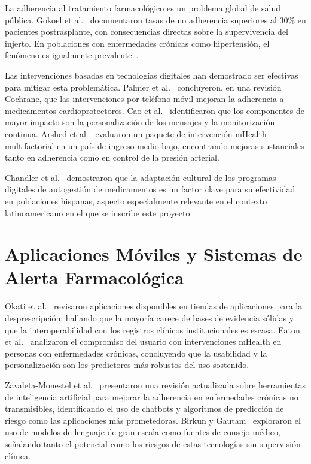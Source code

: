 \documentclass[12pt, letterpaper]{report}
\begin{document}
La adherencia al tratamiento farmacológico es un problema global de salud pública.
Gokoel et al.~\cite{gokoel2020medication} documentaron tasas de no adherencia
superiores al 30\% en pacientes postrasplante, con consecuencias directas sobre la
supervivencia del injerto. En poblaciones con enfermedades crónicas como hipertensión,
el fenómeno es igualmente prevalente~\cite{etminani2020behavior}.

Las intervenciones basadas en tecnologías digitales han demostrado ser efectivas para
mitigar esta problemática. Palmer et al.~\cite{palmer2021mobile} concluyeron, en una
revisión Cochrane, que las intervenciones por teléfono móvil mejoran la adherencia a
medicamentos cardioprotectores. Cao et al.~\cite{cao2022mhealth} identificaron que los
componentes de mayor impacto son la personalización de los mensajes y la monitorización
continua. Arshed et al.~\cite{arshed2024effectiveness} evaluaron un paquete de
intervención mHealth multifactorial en un país de ingreso medio-bajo, encontrando
mejoras sustanciales tanto en adherencia como en control de la presión arterial.

Chandler et al.~\cite{chandler2019impact} demostraron que la adaptación cultural de
los programas digitales de autogestión de medicamentos es un factor clave para su
efectividad en poblaciones hispanas, aspecto especialmente relevante en el contexto
latinoamericano en el que se inscribe este proyecto.

\section{Aplicaciones Móviles y Sistemas de Alerta Farmacológica}

Okati et al.~\cite{okati2025mobile} revisaron aplicaciones disponibles en tiendas de
aplicaciones para la desprescripción, hallando que la mayoría carece de bases de
evidencia sólidas y que la interoperabilidad con los registros clínicos institucionales
es escasa. Eaton et al.~\cite{eaton2024user} analizaron el compromiso del usuario con
intervenciones mHealth en personas con enfermedades crónicas, concluyendo que la
usabilidad y la personalización son los predictores más robustos del uso sostenido.

Zavaleta-Monestel et al.~\cite{zavaleta2025artificial} presentaron una revisión
actualizada sobre herramientas de inteligencia artificial para mejorar la adherencia
en enfermedades crónicas no transmisibles, identificando el uso de chatbots y
algoritmos de predicción de riesgo como las aplicaciones más prometedoras. Birkun y
Gautam~\cite{birkun2024large} exploraron el uso de modelos de lenguaje de gran escala
como fuentes de consejo médico, señalando tanto el potencial como los riesgos de estas
tecnologías sin supervisión clínica.
\end{document}
